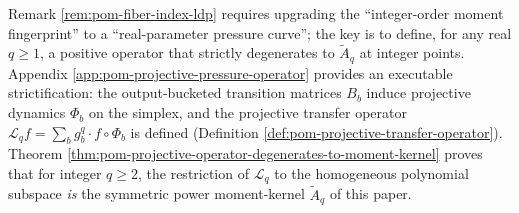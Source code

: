 \begin{remark}\label{rem:pom-moment-q-to-real-projective-operator}
Remark \ref{rem:pom-fiber-index-ldp} requires upgrading the ``integer-order moment fingerprint'' to a ``real-parameter pressure curve''; the key is to define, for any real \(q\ge 1\), a positive operator that strictly degenerates to \(\widetilde A_q\) at integer points.
Appendix \ref{app:pom-projective-pressure-operator} provides an executable strictification: the output-bucketed transition matrices \(B_b\) induce projective dynamics \(\Phi_b\) on the simplex, and the projective transfer operator \(\mathcal{L}_q f=\sum_b g_b^q\cdot f\!\circ\!\Phi_b\) is defined (Definition \ref{def:pom-projective-transfer-operator}).
Theorem \ref{thm:pom-projective-operator-degenerates-to-moment-kernel} proves that for integer \(q\ge 2\), the restriction of \(\mathcal{L}_q\) to the homogeneous polynomial subspace \emph{is} the symmetric power moment-kernel \(\widetilde A_q\) of this paper.
\end{remark}




